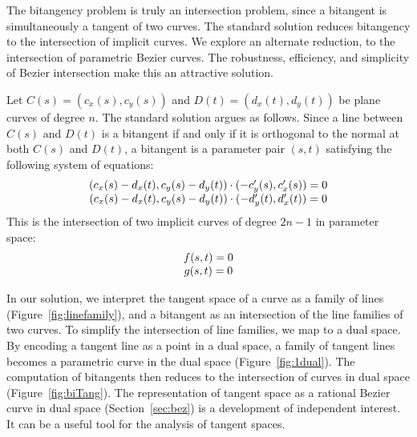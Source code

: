 \documentclass[12pt]{article}
\begin{document}
The bitangency problem is truly an intersection problem,
since a bitangent is simultaneously a tangent of two curves.
The standard solution reduces bitangency to the intersection of implicit curves.
We explore an alternate reduction, 
to the intersection of parametric Bezier curves.
The robustness, efficiency, and simplicity of Bezier intersection
make this an attractive solution.

Let $C(s) = (c_x(s),c_y(s))$ and $D(t) = (d_x(t),d_y(t))$ be 
plane curves of degree $n$.
The standard solution \cite{bajajkim87,parida95} argues as follows.
Since a line between $C(s)$ and $D(t)$ is a bitangent if and only if 
it is orthogonal to the normal at both $C(s)$ and $D(t)$,
a bitangent is a parameter pair $(s,t)$ satisfying the following
system of equations:
%
\[
\begin{tabular}{c}
$(c_x(s) - d_x(t), c_y(s) - d_y(t)) \cdot (-c_y'(s), c_x'(s)) = 0$\\
$(c_x(s) - d_x(t), c_y(s) - d_y(t)) \cdot (-d_y'(t), d_x'(t)) = 0$
\end{tabular}
\]
%
This is the intersection of two implicit curves of degree $2n-1$
in parameter space:
\[
\begin{tabular}{c}
$f(s,t)=0$\\
$g(s,t)=0$
\end{tabular}
\]


In our solution, we interpret the tangent space of a curve as a family of lines
(Figure~\ref{fig:linefamily}),
and a bitangent as an intersection of the line families of two curves.
To simplify the intersection of line families,
we map to a dual space. %
By encoding a tangent line as a point in a dual space,
a family of tangent lines becomes a parametric curve in the dual space
(Figure~\ref{fig:1dual}).
The computation of bitangents then reduces to the intersection of 
curves in dual space (Figure~\ref{fig:biTang}).
The representation of tangent space as a rational Bezier curve in dual space
(Section~\ref{sec:bez}) is a development of independent interest.
It can be a useful tool for the analysis of tangent spaces.
\end{document}
